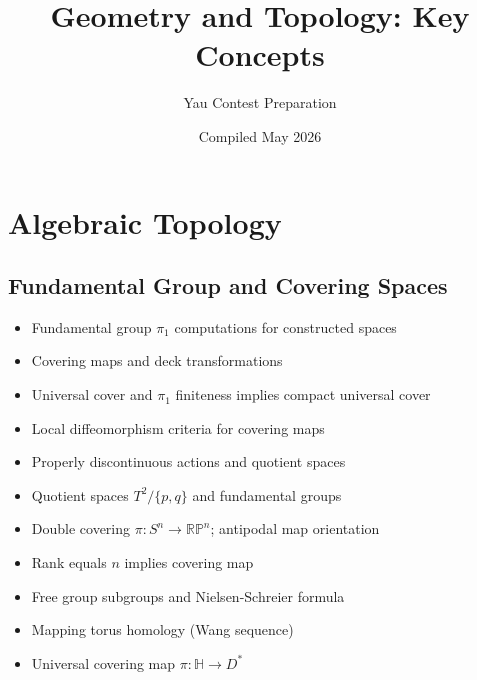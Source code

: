 \documentclass{amsart}
\title{Geometry and Topology: Key Concepts}
\author{Yau Contest Preparation}
\date{Compiled May 2026}
\begin{document}
\maketitle

\section{Algebraic Topology}

\subsection{Fundamental Group and Covering Spaces}
\begin{itemize}
    \item Fundamental group $\pi_1$ computations for constructed spaces
    \item Covering maps and deck transformations
    \item Universal cover and $\pi_1$ finiteness implies compact universal cover
    \item Local diffeomorphism criteria for covering maps
    \item Properly discontinuous actions and quotient spaces
    \item Quotient spaces $T^2/\{p,q\}$ and fundamental groups
    \item Double covering $\pi: S^n \to \mathbb{RP}^n$; antipodal map orientation
    \item Rank equals $n$ implies covering map
    \item Free group subgroups and Nielsen-Schreier formula
    \item Mapping torus homology (Wang sequence)
    \item Universal covering map $\pi: \mathbb{H} \to D^*$
\end{itemize}
\end{document}
